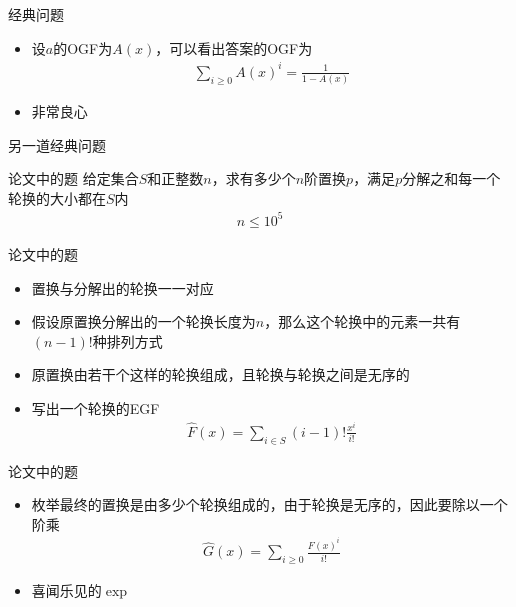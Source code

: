 \documentclass{beamer}
\begin{document}
\begin{frame}{经典问题}
    \begin{itemize}
        \item 设$a$的OGF为$A(x)$，可以看出答案的OGF为
        $$\begin{aligned}
            \sum_{i\geq 0}A(x)^i=\frac{1}{1 - A(x)}
        \end{aligned}$$
        \item 非常良心
    \end{itemize}
\end{frame}

\begin{frame}{另一道经典问题}
    \begin{block}{论文中的题}
        给定集合$S$和正整数$n$，求有多少个$n$阶置换$p$，满足$p$分解之和每一个轮换的大小都在$S$内
        $$\begin{aligned}
            n\leq 10^5
        \end{aligned}$$
    \end{block}
\end{frame}

\begin{frame}{论文中的题}
    \begin{itemize}
        \item 置换与分解出的轮换一一对应\pause
        \item 假设原置换分解出的一个轮换长度为$n$，那么这个轮换中的元素一共有$(n-1)!$种排列方式\pause
        \item 原置换由若干个这样的轮换组成，且轮换与轮换之间是无序的\pause
        \item 写出一个轮换的EGF\pause
        $$\begin{aligned}
            \hat F(x) = \sum_{i\in S}(i-1)!\frac{x^i}{i!}
        \end{aligned}$$
    \end{itemize}
\end{frame}

\begin{frame}{论文中的题}
    \begin{itemize}
        \item 枚举最终的置换是由多少个轮换组成的，由于轮换是无序的，因此要除以一个阶乘\pause
        $$\begin{aligned}
            \hat G(x) = \sum_{i\geq 0}\frac{F(x)^i}{i!}
        \end{aligned}$$
        \item 喜闻乐见的$\exp$
    \end{itemize}
\end{frame}
\end{document}
